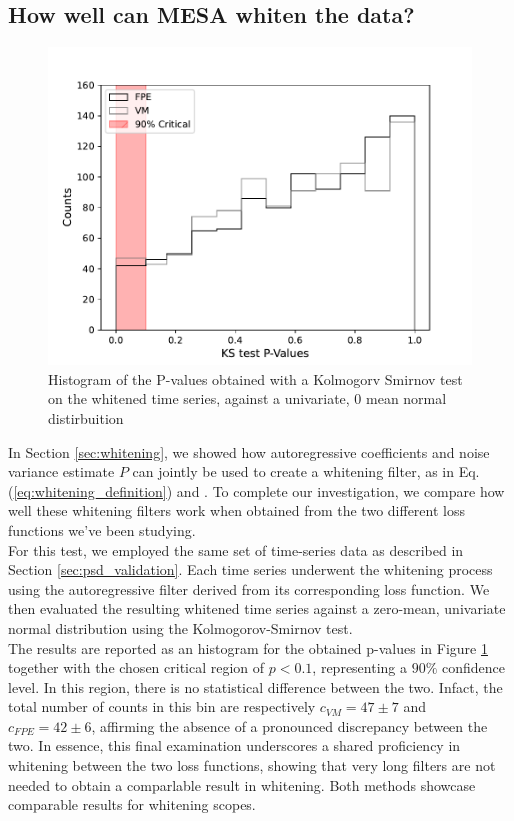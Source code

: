 \documentclass{aa}
\begin{document}
\subsection{How well can MESA whiten the data?}\label{sec:whitening_validation}
\begin{figure}
	\includegraphics[width = \linewidth]{Images/Plots/P_values_comparison}
	\caption{Histogram of the P-values obtained with a Kolmogorv Smirnov test on the whitened time series, against a univariate, 0 mean normal distirbuition}
	\label{fig:whitening}
\end{figure}
In Section \ref{sec:whitening}, we showed how autoregressive coefficients and noise variance estimate $P$ can jointly be used to create a whitening filter, as in Eq. (\ref{eq:whitening_definition}) and . To complete our investigation, we compare how well these whitening filters work when obtained from the two different loss functions we've been studying. \\ 
For this test, we employed the same set of time-series data as described in Section \ref{sec:psd_validation}. Each time series underwent the whitening process using the autoregressive filter derived from its corresponding loss function. We then evaluated the resulting whitened time series against a zero-mean, univariate normal distribution using the Kolmogorov-Smirnov test. \\
The results are reported as an histogram for the obtained p-values in Figure \ref{fig:whitening} together with the chosen critical region of $p < 0.1$, representing a $90\%$  confidence level. In this region, there is no statistical difference between the two. Infact, the total number of counts in this bin are respectively $c_{VM} = 47 \pm 7$ and $c_{FPE} = 42 \pm 6$, affirming the absence of a pronounced discrepancy between the two.
In essence, this final examination underscores a shared proficiency in whitening between the two loss functions, showing that very long filters are not needed to obtain a comparlable result in whitening. Both methods showcase comparable results for whitening scopes.\\
\end{document}
